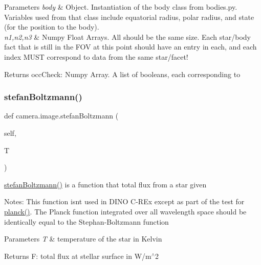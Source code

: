 \begin{DoxyParams}{Parameters}
{\em body} & Object. Instantiation of the body class from bodies.\+py. Variables used from that class include equatorial radius, polar radius, and state (for the position to the body).\\
\hline
{\em n1,n2,n3} & Numpy Float Arrays. All should be the same size. Each star/body fact that is still in the F\+OV at this point should have an entry in each, and each index M\+U\+ST correspond to data from the same star/facet! \\
\hline
\end{DoxyParams}
\begin{DoxyReturn}{Returns}
occ\+Check\+: Numpy Array. A list of booleans, each corresponding to 
\end{DoxyReturn}
\mbox{\label{classcamera_1_1image_afda16877d651ac1801fbea9fcf4583c1}} 
\subsubsection{\texorpdfstring{stefan\+Boltzmann()}{stefanBoltzmann()}}
{\footnotesize\ttfamily def camera.\+image.\+stefan\+Boltzmann (\begin{DoxyParamCaption}\item[{}]{self,  }\item[{}]{T }\end{DoxyParamCaption})}



\hyperlink{classcamera_1_1image_afda16877d651ac1801fbea9fcf4583c1}{stefan\+Boltzmann()} is a function that total flux from a star given 

Notes\+: This function isn\textquotesingle{}t used in D\+I\+NO C-\/\+R\+Ex except as part of the test for \hyperlink{classcamera_1_1image_a9ea76ebff6206130cfbbe8e45fcf0ca6}{planck()}. The Planck function integrated over all wavelength space should be identically equal to the Stephan-\/\+Boltzmann function 
\begin{DoxyParams}{Parameters}
{\em T} & temperature of the star in Kelvin \\
\hline
\end{DoxyParams}
\begin{DoxyReturn}{Returns}
F\+: total flux at stellar surface in W/m$^\wedge$2 
\end{DoxyReturn}
\mbox{\label{classcamera_1_1image_ad5fcc766f1a0be37d8437f46d0fe720d}} 
